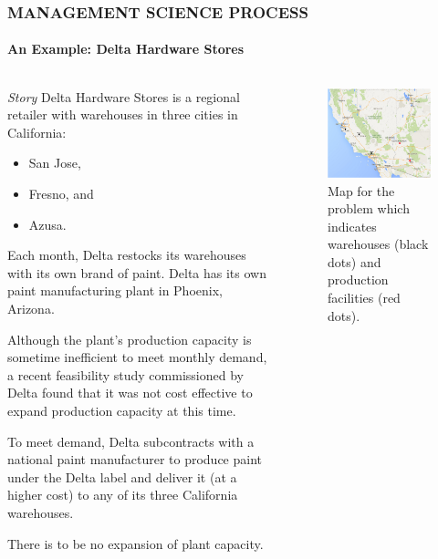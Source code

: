 \documentclass[14 pt]{beamer}
\begin{document}
\begin{frame}[t]
\frametitle{MANAGEMENT SCIENCE PROCESS}
\framesubtitle{An Example: Delta Hardware Stores}

\begin{columns}[t]
\begin{column}{0.45\textwidth}
\emph{Story}
\vskip0.5cm%
Delta Hardware Stores is a regional retailer with warehouses in three cities in California:
\begin{itemize}
  \item San Jose,
  \item Fresno, and
  \item Azusa.
\end{itemize}

Each month, Delta restocks its warehouses with its own brand of paint. Delta has its own paint manufacturing plant in Phoenix, Arizona.

Although the plant’s production capacity is sometime inefficient to meet monthly demand, a recent feasibility study commissioned by Delta found that it was not cost effective to expand production capacity at this time.

To meet demand, Delta subcontracts with a national paint manufacturer to produce paint under the Delta label and deliver it (at a higher cost) to any of its three California warehouses.

There is to be no expansion of plant capacity.
\end{column}

\begin{column}{0.45\textwidth}
\begin{figure}[t]
\includegraphics[width=1\textwidth]{img/an-example-delta}
\caption{Map for the problem which indicates warehouses (black dots) and production facilities (red dots).}
\end{figure}

\end{column}
\end{columns}
\end{frame}
\end{document}
